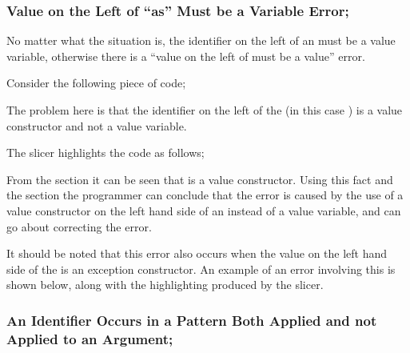 \documentclass{article}
\begin{document}
\begin{itemize}

\subsubsection{Value on the Left of ``as'' Must be a Variable Error;}

\subitem No matter what the situation is, the identifier on the left
of an  must be a value variable, otherwise there is
a ``value on the left of  must be a value'' error.

Consider the following piece of code;


The problem here is that the identifier on the left of the
 (in this case ) is a value
constructor and not a value variable.

The slicer highlights the code as follows;


From the section 
it can be seen that  is a value constructor. Using this
fact and the section  the
programmer can conclude that the error is caused by the use of a value
constructor on the left hand side of an  instead of
a value variable, and can go about correcting the error.

It should be noted that this error also occurs when the value on the
left hand side of the  is an exception constructor.
An example of an error involving this is shown below, along with the
highlighting produced by the slicer.





\newpage


\subsubsection{An Identifier Occurs in a Pattern Both Applied and not Applied
  to an Argument;}


\end{itemize}
\end{document}
